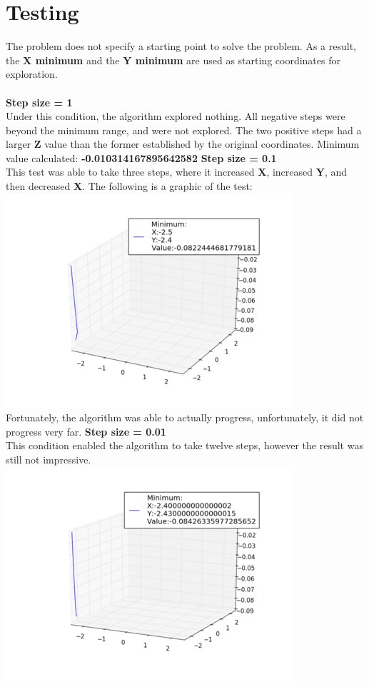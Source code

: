 \documentclass[]{report}
\begin{document}
	\section{Testing}
	The problem does not specify a starting point to solve the problem. As a result, the \textbf{X minimum} and the \textbf{Y minimum} are used as starting coordinates for exploration.\\\\
	\textbf{Step size = 1}\\
	Under this condition, the algorithm explored nothing. All negative steps were beyond the minimum range, and were not explored. The two positive steps had a larger \textbf{Z} value than the former established by the original coordinates.
	Minimum value calculated: \textbf{-0.010314167895642582}\newpage
	\textbf{Step size = 0.1}\\
	This test was able to take three steps, where it increased \textbf{X}, increased \textbf{Y}, and then decreased \textbf{X}. The following is a graphic of the test:\\
	\includegraphics{hc01}\\Fortunately, the algorithm was able to actually progress, unfortunately, it did not progress very far.\newpage
	\textbf{Step size = 0.01}\\
	This condition enabled the algorithm to take twelve steps, however the result was still not impressive.\\
	\includegraphics{hc001}\\
\end{document}
